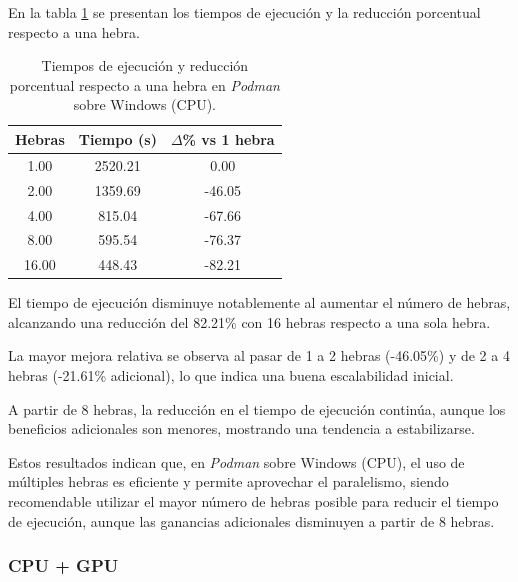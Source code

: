En la tabla \ref{tab:single-node_windows_\textit{Podman}_time} se presentan los tiempos de ejecución y la reducción porcentual respecto a una hebra.

\begin{table}[ht]
    \centering
    \begin{tabular}{|c|c|c|}
        \hline
        \textbf{Hebras} & \textbf{Tiempo (s)} & \textbf{$\Delta$\% vs 1 hebra} \\
        \hline
        1.00            & 2520.21             & 0.00                           \\
        2.00            & 1359.69             & -46.05                         \\
        4.00            & 815.04              & -67.66                         \\
        8.00            & 595.54              & -76.37                         \\
        16.00           & 448.43              & -82.21                         \\
        \hline
    \end{tabular}
    \caption{Tiempos de ejecución y reducción porcentual respecto a una hebra en \textit{Podman} sobre Windows (CPU).}
    \label{tab:single-node_windows_\textit{Podman}_time}
\end{table}

El tiempo de ejecución disminuye notablemente al aumentar el número de hebras, alcanzando una reducción del 82.21\% con 16 hebras respecto a una sola hebra.

La mayor mejora relativa se observa al pasar de 1 a 2 hebras (-46.05\%) y de 2 a 4 hebras (-21.61\% adicional), lo que indica una buena escalabilidad inicial.

A partir de 8 hebras, la reducción en el tiempo de ejecución continúa, aunque los beneficios adicionales son menores, mostrando una tendencia a estabilizarse.

Estos resultados indican que, en \textit{Podman} sobre Windows (CPU), el uso de múltiples hebras es eficiente y permite aprovechar el paralelismo, siendo recomendable utilizar el mayor número de hebras posible para reducir el tiempo de ejecución, aunque las ganancias adicionales disminuyen a partir de 8 hebras.

\subsubsection{CPU + GPU}

